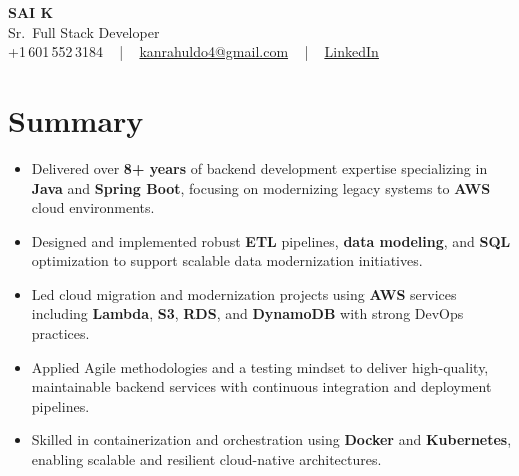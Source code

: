 \documentclass[letterpaper,11pt]{article}
\newcommand{\resumeItem}[1]{
  \item\footnotesize{
    {#1 \vspace{-2pt}}
  }
}
\newcommand{\resumeItemListStart}{\begin{itemize}[leftmargin=*]}
\newcommand{\resumeItemListEnd}{\end{itemize}\vspace{-5pt}}
\begin{document}
\begin{center}
    {\fontsize{14pt}{12pt}\selectfont \textbf{\MakeUppercase{Sai K}}}\\ \vspace{2pt}
    \fontsize{10pt}{12pt}\selectfont Sr.\ Full Stack Developer\\ \vspace{2pt}
    \fontsize{10pt}{12pt}\selectfont +1\,601\,552\,3184 ~ | ~
    \href{mailto:kanrahuldo4@gmail.com}{kanrahuldo4@gmail.com} ~ | ~
    \href{https://www.linkedin.com/in/srrrk/}{\color{blue}\underline{LinkedIn}}
    \vspace{-10pt}
\end{center}

\section{Summary}
\fontsize{9pt}{10pt}\selectfont
\resumeItemListStart
  \resumeItem{Delivered over \textbf{8+ years} of backend development expertise specializing in \textbf{Java} and \textbf{Spring Boot}, focusing on modernizing legacy systems to \textbf{AWS} cloud environments.}
  \resumeItem{Designed and implemented robust \textbf{ETL} pipelines, \textbf{data modeling}, and \textbf{SQL} optimization to support scalable data modernization initiatives.}
  \resumeItem{Led cloud migration and modernization projects using \textbf{AWS} services including \textbf{Lambda}, \textbf{S3}, \textbf{RDS}, and \textbf{DynamoDB} with strong DevOps practices.}
  \resumeItem{Applied Agile methodologies and a testing mindset to deliver high-quality, maintainable backend services with continuous integration and deployment pipelines.}
  \resumeItem{Skilled in containerization and orchestration using \textbf{Docker} and \textbf{Kubernetes}, enabling scalable and resilient cloud-native architectures.}
\resumeItemListEnd
\vspace{-6pt}

\end{document}
